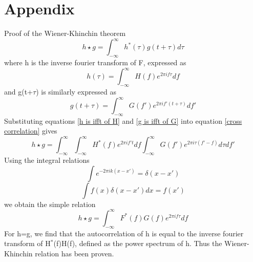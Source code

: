 \documentclass[12pt]{article}
\begin{document}
	\section{Appendix}
	Proof of the Wiener-Khinchin theorem\\
		\begin{equation}\label{cross correlation}
	h \star g=\int_{-\infty}^{\infty}h^{*}(\tau)g(t+\tau)d\tau
	\end{equation}
	where h is the inverse fourier transform of F, expressed as
	\begin{equation}\label{h is ifft of H}
	h(\tau)=\int_{-\infty}^{\infty}H(f)e^{2 \pi i f \tau}df
	\end{equation}
	and g(t+$\tau$) is similarly expressed as 
	\begin{equation}\label{g is ifft of G}
	g(t+\tau)=\int_{-\infty}^{\infty}G(f')e^{2 \pi i f'(t+ \tau)}df'
	\end{equation}
	Substituting equations \ref{h is ifft of H} and \ref{g is ifft of G} into equation \ref{cross correlation} gives
	\begin{equation}\label{cross correlation 2}
	h \star g=\int_{-\infty}^{\infty}\int_{-\infty}^{\infty}H^{*}(f)e^{2 \pi i f't}df \int_{-\infty}^{\infty}G(f')e^{2 \pi i \tau(f'-f)}d\tau df'
	\end{equation}
	Using the integral relations
	\begin{equation}\label{integral relation 1}
	\int e^{-2 \pi i k (x-x')}=\delta(x-x')
	\end{equation}
	\begin{equation}\label{integral relation 2}
	\int f(x)\delta(x-x')dx=f(x')
	\end{equation}
	we obtain the simple relation
	\begin{equation}\label{cross correlation 3}
	h \star g=\int_{-\infty}^{\infty}F^{*}(f)G(f)e^{2 \pi i f\tau}df
	\end{equation}
	For h=g, we find that the autocorrelation of h is equal to the inverse fourier transform of H$^{*}$(f)H(f), defined as the power spectrum of h. Thus the Wiener-Khinchin relation has been proven. 
	
	
\end{document}
